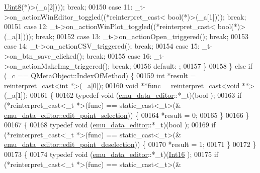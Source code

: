 \begin{DoxyCode}
      \hyperlink{a00001_a979e3e23b9a449e69ab6a8a83b6042f8}{Uint8}(*)\textcolor{keyword}{>}(\_a[2]))); \textcolor{keywordflow}{break};
00150         \textcolor{keywordflow}{case} 11: \_t->on\_actionWinEditor\_toggled((*\textcolor{keyword}{reinterpret\_cast<} \textcolor{keywordtype}{bool}(*)\textcolor{keyword}{>}(\_a[1]))); \textcolor{keywordflow}{break};
00151         \textcolor{keywordflow}{case} 12: \_t->on\_actionWinPlot\_toggled((*\textcolor{keyword}{reinterpret\_cast<} \textcolor{keywordtype}{bool}(*)\textcolor{keyword}{>}(\_a[1]))); \textcolor{keywordflow}{break};
00152         \textcolor{keywordflow}{case} 13: \_t->on\_actionOpen\_triggered(); \textcolor{keywordflow}{break};
00153         \textcolor{keywordflow}{case} 14: \_t->on\_actionCSV\_triggered(); \textcolor{keywordflow}{break};
00154         \textcolor{keywordflow}{case} 15: \_t->on\_btn\_save\_clicked(); \textcolor{keywordflow}{break};
00155         \textcolor{keywordflow}{case} 16: \_t->on\_actionMakeImg\_triggered(); \textcolor{keywordflow}{break};
00156         \textcolor{keywordflow}{default}: ;
00157         \}
00158     \} \textcolor{keywordflow}{else} \textcolor{keywordflow}{if} (\_c == QMetaObject::IndexOfMethod) \{
00159         \textcolor{keywordtype}{int} *result = \textcolor{keyword}{reinterpret\_cast<}\textcolor{keywordtype}{int} *\textcolor{keyword}{>}(\_a[0]);
00160         \textcolor{keywordtype}{void} **func = \textcolor{keyword}{reinterpret\_cast<}\textcolor{keywordtype}{void} **\textcolor{keyword}{>}(\_a[1]);
00161         \{
00162             \textcolor{keyword}{typedef} void (\hyperlink{a00004}{emu\_data\_editor}::*\_t)(bool );
00163             \textcolor{keywordflow}{if} (*reinterpret\_cast<\_t *>(func) == \textcolor{keyword}{static\_cast<}\_t\textcolor{keyword}{>}(&
      \hyperlink{a00004_a9aa2af0c329358fd96f7fb6b7f02bfe1}{emu\_data\_editor::edit\_point\_selection})) \{
00164                 *result = 0;
00165             \}
00166         \}
00167         \{
00168             \textcolor{keyword}{typedef} void (\hyperlink{a00004}{emu\_data\_editor}::*\_t)(bool );
00169             \textcolor{keywordflow}{if} (*reinterpret\_cast<\_t *>(func) == \textcolor{keyword}{static\_cast<}\_t\textcolor{keyword}{>}(&
      \hyperlink{a00004_a2b9629d20c2b97c01bf8486c89fd0148}{emu\_data\_editor::edit\_point\_deselection})) \{
00170                 *result = 1;
00171             \}
00172         \}
00173         \{
00174             \textcolor{keyword}{typedef} void (\hyperlink{a00004}{emu\_data\_editor}::*\_t)(\hyperlink{a00001_a3985266aecb120f269789241c170850c}{Int16} );
00175             \textcolor{keywordflow}{if} (*reinterpret\_cast<\_t *>(func) == \textcolor{keyword}{static\_cast<}\_t\textcolor{keyword}{>}(&

\end{DoxyCode}
